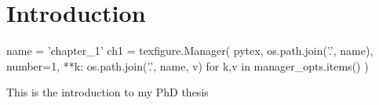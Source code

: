 \chapter{Introduction}\label{ch:introduction}

\begin{pycode}[chapter_1]
name = 'chapter_1'
ch1 = texfigure.Manager(
    pytex,
    os.path.join('.', name),
    number=1,
    **{k: os.path.join('.', name, v) for k,v in manager_opts.items()}
)
\end{pycode}

This is the introduction to my PhD thesis

\citet{bradshaw_cooling_2010} %
